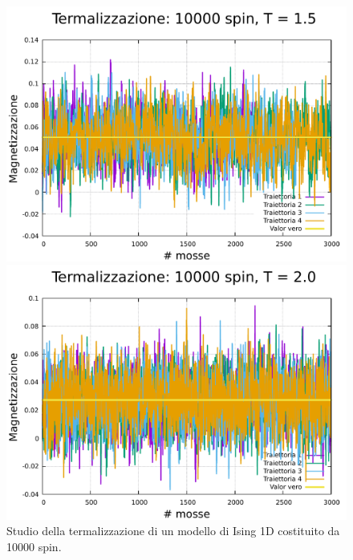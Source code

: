 \begin{figure}[htbp]
    \begin{minipage}{0.45\textwidth}  
      \centering
      \includegraphics[page=1, width=\textwidth]{Immagini/simIsing1D/term/term_10000_1.5.pdf}
      \caption{$T\,=\,1.5$}
    \end{minipage}\hfill
    \begin{minipage}{0.45\textwidth}  
      \centering
      \includegraphics[page=1, width=\textwidth]{Immagini/simIsing1D/term/term_10000_2.0.pdf}
      \caption{$T\,=\,2.0$}
    \end{minipage}
    \caption{Studio della termalizzazione di un modello di Ising 1D costituito da 10000 spin.}
\end{figure}

\vspace*{\fill}

\newpage